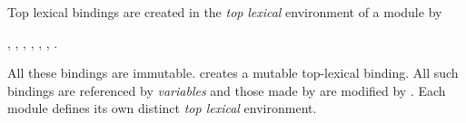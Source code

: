 \begin{optDefinition}
\begin{definitions}
     Top lexical bindings
    are created in the {\em top} {\em lexical} environment of a module by
    \begin{flushleft} , ,
        , ,
        , , .
    \end{flushleft}
    All these bindings are immutable.   creates a mutable
    top-lexical binding.  All such bindings are referenced by {\em variables}
    and those made by  are modified by .
    Each module defines its own distinct {\em top lexical} environment.

\end{definitions}
\end{optDefinition}
